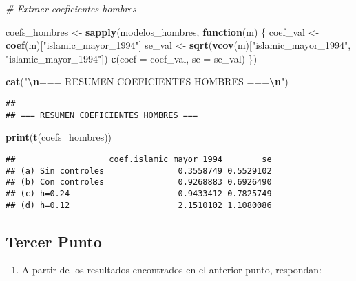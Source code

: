 \documentclass[
]{article}
\newenvironment{Shaded}{\begin{snugshade}}{\end{snugshade}}
\newcommand{\AttributeTok}[1]{\textcolor[rgb]{0.13,0.29,0.53}{#1}}
\newcommand{\CommentTok}[1]{\textcolor[rgb]{0.56,0.35,0.01}{\textit{#1}}}
\newcommand{\ControlFlowTok}[1]{\textcolor[rgb]{0.13,0.29,0.53}{\textbf{#1}}}
\newcommand{\FunctionTok}[1]{\textcolor[rgb]{0.13,0.29,0.53}{\textbf{#1}}}
\newcommand{\NormalTok}[1]{#1}
\newcommand{\OtherTok}[1]{\textcolor[rgb]{0.56,0.35,0.01}{#1}}
\newcommand{\SpecialCharTok}[1]{\textcolor[rgb]{0.81,0.36,0.00}{\textbf{#1}}}
\newcommand{\StringTok}[1]{\textcolor[rgb]{0.31,0.60,0.02}{#1}}
\providecommand{\tightlist}{%
  \setlength{\itemsep}{0pt}\setlength{\parskip}{0pt}}
\begin{document}
\begin{Shaded}
\begin{Highlighting}[]
\CommentTok{\# Extraer coeficientes hombres}

\NormalTok{coefs\_hombres }\OtherTok{\textless{}{-}} \FunctionTok{sapply}\NormalTok{(modelos\_hombres, }\ControlFlowTok{function}\NormalTok{(m) \{}
\NormalTok{  coef\_val }\OtherTok{\textless{}{-}} \FunctionTok{coef}\NormalTok{(m)[}\StringTok{"islamic\_mayor\_1994"}\NormalTok{]}
\NormalTok{  se\_val }\OtherTok{\textless{}{-}} \FunctionTok{sqrt}\NormalTok{(}\FunctionTok{vcov}\NormalTok{(m)[}\StringTok{"islamic\_mayor\_1994"}\NormalTok{, }\StringTok{"islamic\_mayor\_1994"}\NormalTok{])}
  \FunctionTok{c}\NormalTok{(}\AttributeTok{coef =}\NormalTok{ coef\_val, }\AttributeTok{se =}\NormalTok{ se\_val)}
\NormalTok{\})}

\FunctionTok{cat}\NormalTok{(}\StringTok{"}\SpecialCharTok{\textbackslash{}n}\StringTok{=== RESUMEN COEFICIENTES HOMBRES ===}\SpecialCharTok{\textbackslash{}n}\StringTok{"}\NormalTok{)}
\end{Highlighting}
\end{Shaded}

\begin{verbatim}
## 
## === RESUMEN COEFICIENTES HOMBRES ===
\end{verbatim}

\begin{Shaded}
\begin{Highlighting}[]
\FunctionTok{print}\NormalTok{(}\FunctionTok{t}\NormalTok{(coefs\_hombres))}
\end{Highlighting}
\end{Shaded}

\begin{verbatim}
##                   coef.islamic_mayor_1994        se
## (a) Sin controles               0.3558749 0.5529102
## (b) Con controles               0.9268883 0.6926490
## (c) h=0.24                      0.9433412 0.7825749
## (d) h=0.12                      2.1510102 1.1080086
\end{verbatim}

\subsection{Tercer Punto}\label{tercer-punto}

\begin{enumerate}
\def\labelenumi{\arabic{enumi}.}
\setcounter{enumi}{2}
\tightlist
\item
  A partir de los resultados encontrados en el anterior punto,
  respondan:
\end{enumerate}
\end{document}
